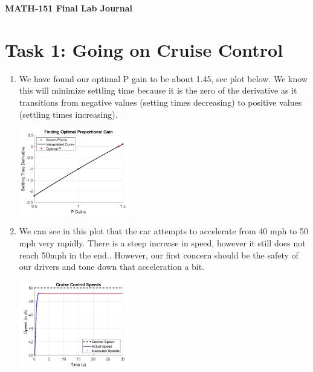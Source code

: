 \documentclass[11pt]{article}
\begin{document}
	
	\begin{center}
		\Large{\textbf{MATH-151 Final Lab Journal}}\\
	\end{center}
	\noindent\makebox[\linewidth]{\rule{\textwidth}{0.4pt}}
	\section*{Task 1: Going on Cruise Control}
	\begin{enumerate}[label=\alph*)]
		\item We have found our optimal P gain to be about 1.45, see plot below. We know this will minimize settling time because it is the zero of the derivative as it transitions from negative values (setting times decreasing) to positive values (settling times increasing). \\
		\begin{center}
			\includegraphics[width = 5cm]{Part_a_Minimizer.png}
		\end{center}
		
		\item We can see in this plot that the car attempts to accelerate from 40 mph to 50 mph very rapidly. There is a steep increase in speed, however it still does not reach 50mph in the end.. However, our first concern should be the safety of our drivers and tone down that acceleration a bit.\\
			\begin{center}
				\includegraphics[width = 5cm]{Part_b.png}
			\end{center}
		

\end{enumerate}
\end{document}
